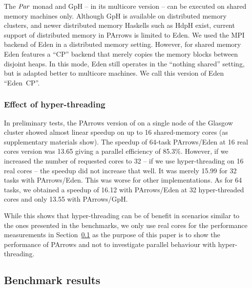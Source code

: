 The \ensuremath{\Conid{Par}} monad and GpH -- in its multicore version \cite{Marlow2009} --  can be executed on shared memory machines only.
Although GpH is available on distributed memory
clusters, and newer distributed memory Haskells such as HdpH exist,
current support of distributed memory in PArrows is limited to
Eden. We used the MPI backend of Eden in a distributed memory
setting. However, for shared memory Eden features a \enquote{CP} backend
that merely copies the memory blocks between disjoint heaps. In
this mode, Eden still operates in the \enquote{nothing shared} setting, but
is adapted better to multicore machines. We call this version of Eden
\enquote{Eden~CP}.



\subsubsection{Effect of hyper-threading}

In preliminary tests, the PArrows version of \rmtest on a single node of the Glasgow cluster
showed almost linear speedup on up to 16 shared-memory cores (as supplementary materials show). The speedup
of 64-task PArrows/Eden at 16 real cores version was 13.65 giving a parallel
efficiency of 85.3\%. However, if we increased the number of
requested cores to 32 -- \ie if we use hyper-threading on 16 real
cores -- the speedup did not increase that well. It was merely 15.99
for 32 tasks with PArrows/Eden. This was worse for other implementations.  As
for 64 tasks, we obtained a speedup of 16.12 with PArrows/Eden at 32
hyper-threaded cores and only 13.55 with PArrows/GpH. 

While this shows that hyper-threading can be of benefit in scenarios similar to the ones presented in the benchmarks, we only use real cores for the performance measurements in Section~\ref{sec:benchmarkResults} as the purpose of this paper is to show the performance of PArrows and not to investigate parallel behaviour with hyper-threading.




\subsection{Benchmark results}\label{sec:benchmarkResults}

